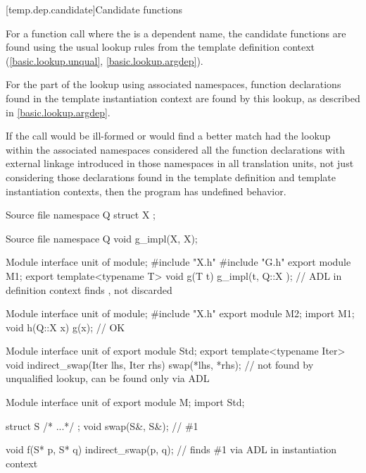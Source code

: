[temp.dep.candidate]{Candidate functions}

\pnum
{}%
For a function call where the  is a
dependent name,
the candidate functions are found using the usual lookup
rules from the template definition context
(\ref{basic.lookup.unqual}, \ref{basic.lookup.argdep}).
\begin{note}
For the part of the lookup using associated namespaces,
function declarations found in the template instantiation context
are found by this lookup, as described in \ref{basic.lookup.argdep}.
\end{note}
If
the call would be ill-formed or would find a better match had the lookup
within the associated namespaces considered all the function declarations with
external linkage introduced in those namespaces in all translation units,
not just considering those declarations found in the template definition and
template instantiation contexts, then the program has undefined behavior.

\pnum
\begin{example}
\begin{codeblocktu}{Source file }
namespace Q {
  struct X { };
}
\end{codeblocktu}

\begin{codeblocktu}{Source file }
namespace Q {
  void g_impl(X, X);
}
\end{codeblocktu}

\begin{codeblocktu}{Module interface unit of }
module;
#include "X.h"
#include "G.h"
export module M1;
export template<typename T>
void g(T t) {
  g_impl(t, Q::X{ });   // ADL in definition context finds ,  not discarded
}
\end{codeblocktu}

\begin{codeblocktu}{Module interface unit of }
module;
#include "X.h"
export module M2;
import M1;
void h(Q::X x) {
   g(x);                // OK
}
\end{codeblocktu}
\end{example}

\pnum
\begin{example}
\begin{codeblocktu}{Module interface unit of }
export module Std;
export template<typename Iter>
void indirect_swap(Iter lhs, Iter rhs)
{
  swap(*lhs, *rhs);     //  not found by unqualified lookup, can be found only via ADL
}
\end{codeblocktu}

\begin{codeblocktu}{Module interface unit of }
export module M;
import Std;

struct S { /* ...*/ };
void swap(S&, S&);      // \#1

void f(S* p, S* q)
{
  indirect_swap(p, q);  // finds \#1 via ADL in instantiation context
}
\end{codeblocktu}
\end{example}

